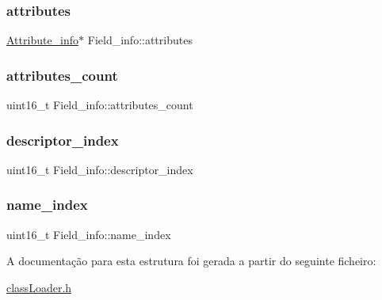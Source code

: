 \subsubsection{\texorpdfstring{attributes}{attributes}}
{\footnotesize\ttfamily \hyperlink{struct_attribute__info}{Attribute\+\_\+info}$\ast$ Field\+\_\+info\+::attributes}

\hypertarget{struct_field__info_aba9e2147bd09cbcb686b223f1737a2e4}{}\label{struct_field__info_aba9e2147bd09cbcb686b223f1737a2e4} 
\subsubsection{\texorpdfstring{attributes\+\_\+count}{attributes\_count}}
{\footnotesize\ttfamily uint16\+\_\+t Field\+\_\+info\+::attributes\+\_\+count}

\hypertarget{struct_field__info_af108293f133b1cd3a98285694d1299dd}{}\label{struct_field__info_af108293f133b1cd3a98285694d1299dd} 
\subsubsection{\texorpdfstring{descriptor\+\_\+index}{descriptor\_index}}
{\footnotesize\ttfamily uint16\+\_\+t Field\+\_\+info\+::descriptor\+\_\+index}

\hypertarget{struct_field__info_ab06ae42bbb051661509e6935932e3e6c}{}\label{struct_field__info_ab06ae42bbb051661509e6935932e3e6c} 
\subsubsection{\texorpdfstring{name\+\_\+index}{name\_index}}
{\footnotesize\ttfamily uint16\+\_\+t Field\+\_\+info\+::name\+\_\+index}



A documentação para esta estrutura foi gerada a partir do seguinte ficheiro\+:\begin{DoxyCompactItemize}
\item 
\hyperlink{class_loader_8h}{class\+Loader.\+h}\end{DoxyCompactItemize}
